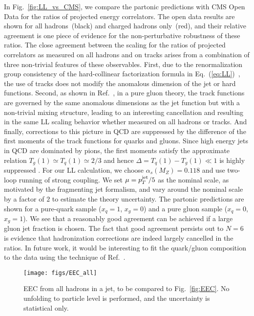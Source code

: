 \documentclass[aps,prl,twocolumn,showpacs,10pt,superscriptaddress,preprintnumbers,nofootinbib,longbibliography]{revtex4-1}
\DeclareRobustCommand{\Fig}[1]{Fig.~\ref{#1}}
\DeclareRobustCommand{\Eq}[1]{Eq.~(\ref{#1})}
\begin{document}
In \Fig{fig:LL_vs_CMS}, we compare the partonic predictions with CMS Open Data for the ratios of projected energy correlators.
%
The open data results are shown for all hadrons~(black) and charged hadrons only~(red), and their relative agreement is one piece of evidence for the non-perturbative robustness of these ratios.
%
The close agreement between the scaling for the ratios of projected correlators as measured on all hadrons and on tracks arises from a combination of three non-trivial features of these observables. First, due to the renormalization group consistency of the hard-collinear factorization formula in \Eq{eq:LL}~\cite{Chen:2020vvp}, the use of tracks does not modify the anomalous dimension of the jet or hard functions. Second, as shown in Ref.~\cite{Chen:2020vvp}, in a pure gluon theory, the track functions are governed by the same anomalous dimensions as the jet function but with a non-trivial mixing structure, leading to an interesting cancellation and resulting in the same LL scaling behavior whether measured on all hadrons or tracks. And finally, corrections to this picture in QCD are suppressed by the difference of the first moments of the track functions for quarks and gluons. Since high energy jets in QCD are dominated by pions, the first moments satisfy the approximate relation $T_g(1)\simeq T_q(1) \simeq 2/3$ and hence $\Delta=T_q(1)-T_g(1)\ll 1$ is highly suppressed \cite{Li:2021zcf,Jaarsma:2022kdd}.
%
For our LL calculation, we choose $\alpha_s (M_Z) = 0.118$ and use two-loop running of strong coupling. 
%
We set $\mu =  p_T^{\rm jet}/5$ as the nominal scale, as motivated by the fragmenting jet formalism, and vary around the nominal scale by a factor of $2$ to estimate the theory uncertainty.  
%
The partonic predictions are shown for a pure-quark sample ($x_q = 1$, $x_g=0$) and a pure gluon sample ($x_q = 0$, $x_g= 1$).
%
We see that a reasonably good agreement can be achieved if a large gluon jet fraction is chosen.
%
The fact that good agreement persists out to $N = 6$ is evidence that hadronization corrections are indeed largely cancelled in the ratios. 
%
In future work, it would be interesting to fit the quark/gluon composition to the data using the technique of Ref.~\cite{Komiske:2018vkc}.

\begin{figure}[t]
\texttt{[image: figs/EEC\_all]}
\caption{EEC from all hadrons in a jet, to be compared to \Fig{fig:EEC}.  No unfolding to particle level is performed, and the uncertainty is statistical only.}
\label{fig:EEC_all}
\end{figure}
\end{document}
